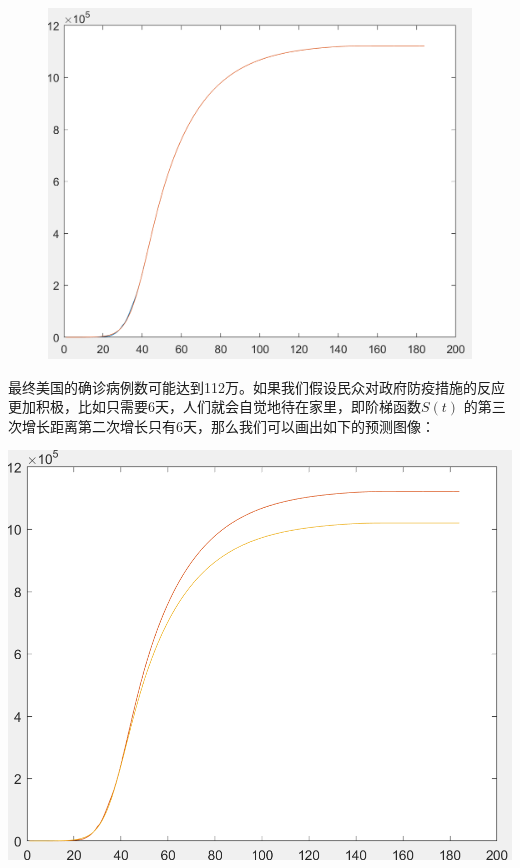 \documentclass[UTF8]{ctexart}
\begin{document}
				\begin{figure}[H]
					\centering
					\includegraphics[scale=0.25]{4.png}
					
				\end{figure}
				
				最终美国的确诊病例数可能达到112万。如果我们假设民众对政府防疫措施的反应更加积极，比如只需要6天，人们就会自觉地待在家里，即阶梯函数$S(t)$ 的第三次增长距离第二次增长只有6天，那么我们可以画出如下的预测图像：
				
		
					\centerline{\includegraphics[scale=0.25]{5.png}}
		
\end{document}
